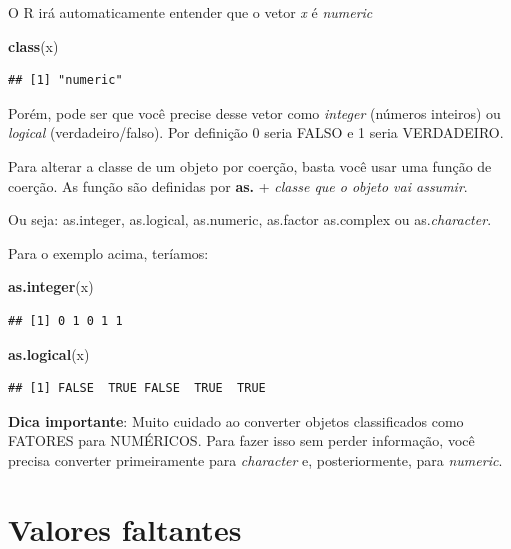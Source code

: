 \documentclass[
]{book}
\newenvironment{Shaded}{\begin{snugshade}}{\end{snugshade}}
\newcommand{\KeywordTok}[1]{\textcolor[rgb]{0.13,0.29,0.53}{\textbf{#1}}}
\newcommand{\NormalTok}[1]{#1}
\begin{document}
O R irá automaticamente entender que o vetor \emph{x} é \emph{numeric}

\begin{Shaded}
\begin{Highlighting}[]
\KeywordTok{class}\NormalTok{(x)}
\end{Highlighting}
\end{Shaded}

\begin{verbatim}
## [1] "numeric"
\end{verbatim}

Porém, pode ser que você precise desse vetor como \emph{integer}
(números inteiros) ou \emph{logical} (verdadeiro/falso). Por definição 0
seria FALSO e 1 seria VERDADEIRO.

Para alterar a classe de um objeto por coerção, basta você usar uma
função de coerção. As função são definidas por \textbf{as.} +
\emph{classe que o objeto vai assumir}.

Ou seja: as.integer, as.logical, as.numeric, as.factor as.complex ou
as.\emph{character}.

Para o exemplo acima, teríamos:

\begin{Shaded}
\begin{Highlighting}[]
\KeywordTok{as.integer}\NormalTok{(x)}
\end{Highlighting}
\end{Shaded}

\begin{verbatim}
## [1] 0 1 0 1 1
\end{verbatim}

\begin{Shaded}
\begin{Highlighting}[]
\KeywordTok{as.logical}\NormalTok{(x)}
\end{Highlighting}
\end{Shaded}

\begin{verbatim}
## [1] FALSE  TRUE FALSE  TRUE  TRUE
\end{verbatim}

\textbf{Dica importante}: Muito cuidado ao converter objetos
classificados como FATORES para NUMÉRICOS. Para fazer isso sem perder
informação, você precisa converter primeiramente para \emph{character}
e, posteriormente, para \emph{numeric}.

\hypertarget{valores-faltantes}{%
\section{Valores faltantes}\label{valores-faltantes}}
\end{document}
